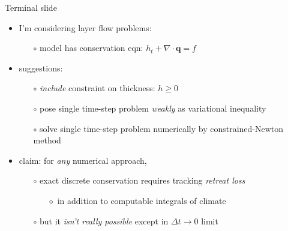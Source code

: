 \documentclass{beamer}
\newcommand\bq{\mathbf{q}}
\newcommand{\Div}{\nabla\cdot}
\begin{document}
\begin{frame}{Terminal slide}

  \begin{itemize}
  \item I'm considering layer flow problems:
    \begin{itemize}
    \item[$\circ$]  model has conservation eqn: $h_t + \Div\bq = f$
    \end{itemize}
  \item suggestions:
    \begin{itemize}
    \item[$\circ$]  \emph{include} constraint on thickness: $h\ge 0$
    \item[$\circ$]  pose single time-step problem \emph{weakly} as variational inequality
    \item[$\circ$]  solve single time-step problem numerically by constrained-Newton method
    \end{itemize}
  \item claim:  for \emph{any} numerical approach,
    \begin{itemize}
    \item[$\circ$]  exact discrete conservation requires tracking \emph{retreat loss}
      \begin{itemize}
      \item[$\diamond$] in addition to computable integrals of climate
      \end{itemize}
    \item[$\circ$]  but it \emph{isn't really possible} except in $\Delta t\to 0$ limit
    \end{itemize}
  \end{itemize}
\end{frame}
\end{document}
